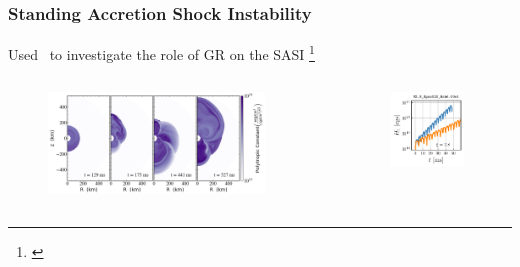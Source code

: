 \documentclass{beamer}
\begin{document}
\begin{frame}
\frametitle{Standing Accretion Shock Instability}

  Used \thornado\ to investigate the role of GR on the SASI%
  \footnote{\citet{dem2020,dem2024}}

  \begin{columns}[c]


      \begin{figure}[htb!]
        \centering
        \includegraphics[width=0.9\textwidth]{fig.sasi.png}
      \end{figure}


      \begin{figure}[htb!]
        \centering
        \includegraphics[width=0.9\textwidth]{fig.sasi_GRvNR.pdf}
      \end{figure}

  \end{columns}

\end{frame}
\end{document}

